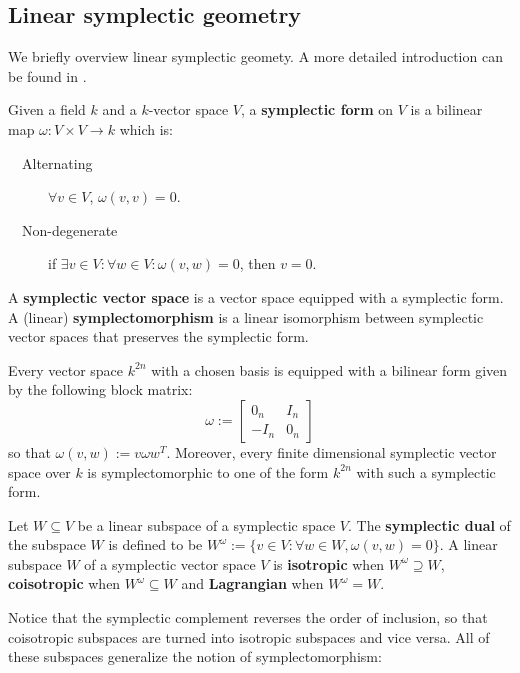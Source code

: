 \subsection{Linear symplectic geometry}
We briefly overview linear symplectic geomety.  A more detailed introduction can be found in \cite{weinsteinsymplectic}.
\begin{definition}
  Given a field  $k$ and a $k$-vector space $V$, a {\bf symplectic form} on $V$ is a bilinear map $\omega:V\times V\to k$ which is:
\begin{description}
 \item[\ \ Alternating] $\forall v \in V$, $\omega(v,v)=0$.
 \item[\ \ Non-degenerate] if $\exists v \in V: \forall w \in V: \omega(v,w)=0$, then $v=0$.
\end{description}
  A {\bf symplectic vector space} is a vector space equipped with a symplectic form. A (linear) {\bf symplectomorphism} is a linear isomorphism between symplectic vector spaces that preserves the symplectic form.
\end{definition}


\begin{lemma}
\label{lemma:sform}
Every vector space $k^{2n}$ with a chosen basis is equipped with a bilinear form given by the following block matrix:
$$
\omega:=
\begin{bmatrix}
0_n & I_n\\
-I_n & 0_n
\end{bmatrix}
$$
so that $\omega(v,w) := v \omega w^T$.
Moreover, every finite dimensional symplectic vector space over $k$ is symplectomorphic to one of the form $k^{2n}$ with such a symplectic form.
\end{lemma}


\begin{definition}

Let $W \subseteq V$ be a linear subspace of a symplectic space $V$.
The {\bf symplectic dual} of the subspace $W$ is defined to be
$
W^\omega:= \{v \in V : \forall w \in W, \omega(v,w)=0 \}
$.
A linear subspace  $W$ of a symplectic vector space $V$ is {\bf isotropic} when $W^\omega \supseteq W$, {\bf coisotropic} when $W^\omega \subseteq W$ and {\bf Lagrangian} when $W^\omega=W$.
\end{definition}
Notice that the symplectic complement reverses the order of inclusion, so that coisotropic subspaces are turned into isotropic subspaces and vice versa.  All of these subspaces generalize the notion of symplectomorphism:

